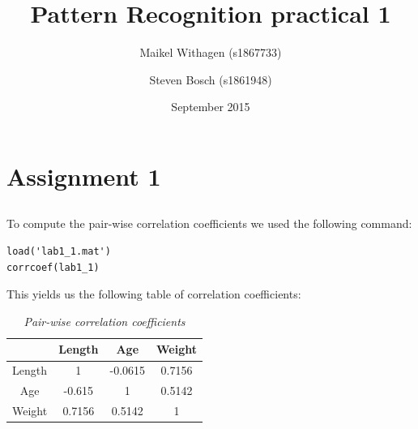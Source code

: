 \documentclass{article}
\title{Pattern Recognition practical 1}
\author{Maikel Withagen (s1867733) \and Steven Bosch (s1861948)}
\date{September 2015}
\begin{document}
\maketitle

\section{Assignment 1}
\subsection{}
To compute the pair-wise correlation coefficients we used the following command:
\begin{lstlisting}[title= Input]
load('lab1_1.mat')
corrcoef(lab1_1)
\end{lstlisting}
This yields us the following table of correlation coefficients:
\begin{table}[H]
	\caption{\textit{Pair-wise correlation coefficients}}
	\vspace{0.1cm}
	\centering
	\begin{tabular}{|c|c|c|c|}
		\hline
		& Length & Age & Weight \\
		\hline
		Length & 1 & -0.0615 & 0.7156 \\
		\hline
		Age & -0.615 & 1 & 0.5142 \\
		\hline
		Weight & 0.7156 & 0.5142 & 1 \\ 
		\hline
	\end{tabular}
	\label{tab1.2}
\end{table}

\subsection{}
\end{document}
